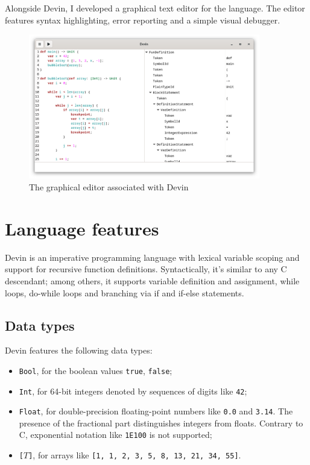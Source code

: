 \documentclass[UdineBachThesis,american,11pt]{PhdThesis}
\begin{document}
  Alongside Devin, I developed a graphical text editor for the language. The
  editor features syntax highlighting, error reporting and a simple visual
  debugger.

  \begin{figure}[H]
    \centering
    \includegraphics[width=0.9\textwidth]{2.png}
    \caption{The graphical editor associated with Devin}
  \end{figure}

  \section{Language features}

  Devin is an imperative programming language with lexical variable scoping and
  support for recursive function definitions. Syntactically, it's similar to any
  C descendant; among others, it supports variable definition and assignment,
  while loops, do-while loops and branching via if and if-else statements.

  \subsection{Data types}

  Devin features the following data types:

  \begin{itemize}
    \item \mbox{\texttt{Bool}}, for the boolean values \mbox{\texttt{true}},
    \mbox{\texttt{false}};

    \item \mbox{\texttt{Int}}, for 64-bit integers denoted by sequences of
    digits like \mbox{\texttt{42}};

    \item \mbox{\texttt{Float}}, for double-precision floating-point numbers
    like \mbox{\texttt{0.0}} and \mbox{\texttt{3.14}}. The presence of the
    fractional part distinguishes integers from floats. Contrary to C,
    exponential notation like \mbox{\texttt{1E100}} is not supported;

    \item \mbox{\texttt{[$T$]}}, for arrays like
    \mbox{\texttt{[1, 1, 2, 3, 5, 8, 13, 21, 34, 55]}}.
  \end{itemize}
\end{document}
